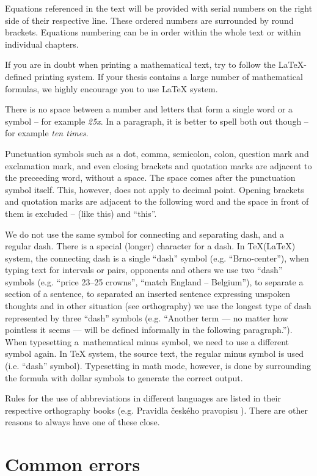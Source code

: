 Equations referenced in the text will be provided with serial numbers on the right side of their respective line. These ordered numbers are surrounded by round brackets. Equations numbering can be in order within the whole text or within individual chapters.

If you are in doubt when printing a mathematical text, try to follow the LaTeX-defined printing system. If your thesis contains a large number of mathematical formulas, we highly encourage you to use LaTeX system.

There is no space between a number and letters that form a single word or a symbol -- for example {\it 25x}. In a paragraph, it is better to spell both out though -- for example {\it ten times}.

Punctuation symbols such as a dot, comma, semicolon, colon, question mark and exclamation mark, and even closing brackets and quotation marks are adjacent to the preceeding word, without a space. The space comes after the punctuation symbol itself. This, however, does not apply to decimal point. Opening brackets and quotation marks are adjacent to the following word and the space in front of them is excluded -- (like this) and ``this''.

We do not use the same symbol for connecting and separating dash, and a regular dash. There is a special (longer) character for a dash. In \TeX (\LaTeX ) system, the connecting dash is a single ``dash'' symbol (e.g. ``Brno-center''), when typing text for intervals or pairs, opponents and others we use two ``dash'' symbols (e.g. ``price 23--25 crowns'', ``match England -- Belgium''), to separate a section of a sentence, to separated an inserted sentence expressing unspoken thoughts and in other situation (see orthography) we use the longest type of dash represented by three ``dash'' symbols (e.g. ``Another term --- no matter how pointless it seems --- will be defined informally in the following paragraph.''). When typesetting a~mathematical minus symbol, we need to use a different symbol again. In TeX system, the source text, the regular minus symbol is used (i.e. ``dash'' symbol). Typesetting in math mode, however, is done by surrounding the formula with dollar symbols to generate the correct output.

Rules for the use of abbreviations in different languages are listed in their respective orthography books (e.g. Pravidla českého pravopisu \cite{Pravidla}). There are other reasons to always have one of these close.

\section{Common errors}
\label{chyby}


